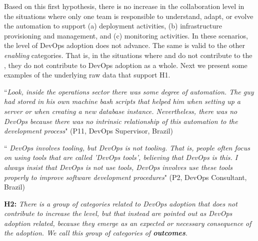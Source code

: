 Based on this first hypothesis, there is no increase in the collaboration
level in the situations where only one team is responsible to understand, adapt, or
evolve the automation to support (a) deployment activities, (b) infrastructure provisioning and management,
and (c) monitoring activities. In these scenarios, the level of DevOps adoption does not advance.
The same is valid to the other \emph{enabling} categories. That is, in the situations where
 and  do not contribute to
the , they do not contribute to DevOps adoption as a whole. Next
we present some examples of the underlying raw data that support H1.

\begin{mq}
``\emph{Look, inside the operations sector there was some degree of automation. The guy
had stored in his own machine bash scripts that helped him when setting up a
server or when creating a new database instance. Nevertheless, there was no DevOps
because there was no intrinsic relationship of this automation to the
development process}" (P11, DevOps Supervisor, Brazil)
\end{mq}


\begin{mq}
``\emph{
DevOps involves tooling, but DevOps is not tooling. That is, people often
focus on using tools that are called 'DevOps tools', believing that DevOps is
this. I always insist that DevOps is not use tools, DevOps involves use these
tools properly to improve software development procedures}" (P2, DevOps
Consultant, Brazil)
\end{mq}



\begin{mh}
\textbf{H2:} \textit{There is a group of categories related to DevOps adoption
that does not contribute to increase the}  \emph{level, but that instead are
pointed out as DevOps adoption related, because they emerge as an expected or
necessary consequence of the adoption. We call this group of categories of
\textbf{outcomes}}.
\end{mh}

